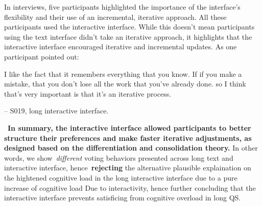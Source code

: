 In interviews, five participants highlighted the importance of the interface's flexibility and their use of an incremental, iterative approach. All these participants used the interactive interface. While this doesn't mean participants using the text interface didn't take an iterative approach, it highlights that the interactive interface encouraged iterative and incremental updates. As one participant pointed out:

\begin{displayquote}
I like the fact that it remembers everything that you know. If if you make a mistake, that you don't lose all the work that you've already done. so I think that's very important is that it's an iterative process.

\noindent \hfill -- S019, long interactive interface.
\end{displayquote}

~\textbf{In summary, the interactive interface allowed participants to better structure their preferences and make faster iterative adjustments, as designed based on the differentiation and consolidation theory.} In other words, we show~\textit{different} voting behaviors presented across long text and interactive interface, hence~\textbf{rejecting} the alternative plausible explaination on the hightened cognitive load in the long interactive interface due to a pure increase of cognitive load Due to interactivity, hence further concluding that the interactive interface prevents satisficing from cognitive overload in long QS.



